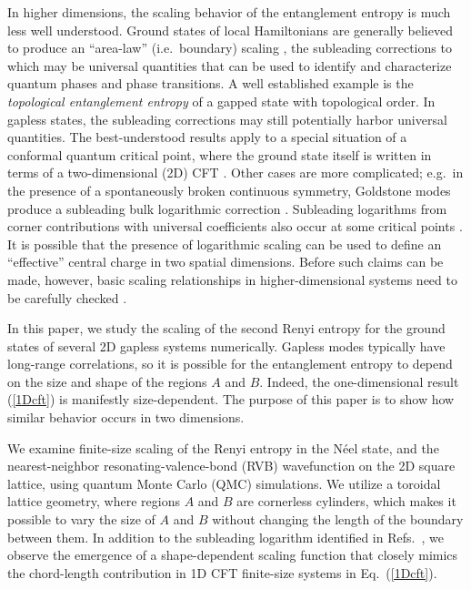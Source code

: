 \documentclass[prl,aps,twocolumn,floatfix,amsmath,amssymb,superscriptaddress,tightenlines]{revtex4}
\begin{document}
In higher dimensions, the scaling behavior of the entanglement entropy
is much less well understood.  Ground states of local Hamiltonians are
generally believed to produce an ``area-law'' (i.e.\ boundary) scaling
\cite{ALreview}, the subleading corrections to which may be universal
quantities that can be used to identify and characterize quantum
phases and phase transitions.  A well established example is the {\it
topological entanglement entropy} \cite{Alioscia1,Alioscia2,KP,LW} of
a gapped state with topological order.  In gapless states, the
subleading corrections may still potentially harbor universal
quantities.  %
The best-understood results apply to a special situation of a conformal quantum critical point,
where the ground state itself is written in terms of a two-dimensional
(2D) CFT \cite{Moore06,Hsu08,Misguich}.  Other cases are more
complicated; e.g.\ in the presence of a spontaneously broken
continuous symmetry, Goldstone modes produce a subleading bulk
logarithmic correction \cite{HeisLog,MaxLog}.  Subleading logarithms
from corner contributions with universal coefficients also occur at
some critical points \cite{Moore06,logcorner,Max}.  It is possible
that the presence of logarithmic scaling can be used to define an
``effective'' central charge in two spatial dimensions.  Before such
claims can be made, however, basic scaling relationships in
higher-dimensional systems need to be carefully checked \cite{EE_CFT}.

In this paper, we study the scaling of the second Renyi entropy for
the ground states of several 2D gapless systems numerically. Gapless
modes typically have long-range correlations, so it is possible for
the entanglement entropy to depend on the size and shape of the
regions $A$ and $B$. Indeed, the one-dimensional result
(\ref{1Dcft}) is manifestly size-dependent. The purpose of this
paper is to show how similar behavior occurs in two dimensions.

We examine finite-size scaling of the Renyi entropy in the N\'eel state, and the nearest-neighbor resonating-valence-bond (RVB) wavefunction
on the 2D square lattice, using quantum Monte Carlo (QMC) simulations.
We utilize a toroidal lattice geometry, where regions $A$ and $B$ are cornerless cylinders, which makes it possible to vary the size of $A$ and $B$ without changing the length of the boundary between them. 
In addition to the subleading logarithm identified in Refs.~\cite{HeisLog,MaxLog},
we observe the emergence of a shape-dependent scaling function that closely mimics the chord-length contribution in 1D CFT finite-size systems in Eq.~(\ref{1Dcft}).
\end{document}
